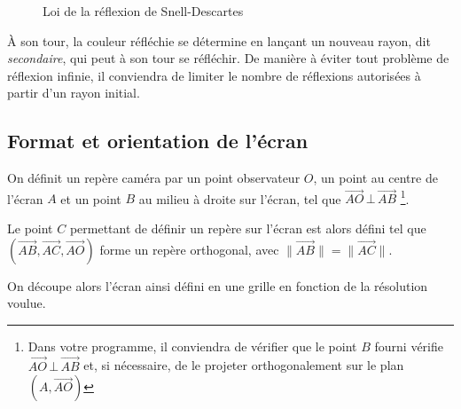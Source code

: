 \documentclass[10pt, a4paper ]{article}
\begin{document}
\begin{figure}[ht]
    \begin{center}
    \end{center}
    \caption{Loi de la réflexion de Snell-Descartes}
    \label{fig:descartes}
\end{figure}


À son tour, la couleur réfléchie se détermine en lançant un nouveau rayon, dit
\emph{secondaire}, qui peut à son tour se réfléchir. De manière à éviter tout
problème de réflexion infinie, il conviendra de limiter le nombre de réflexions
autorisées à partir d'un rayon initial.

\subsection{Format et orientation de l'écran}

On définit un repère caméra par un point observateur $O$, un point au centre de
l'écran $A$ et un point $B$ au milieu à droite sur l'écran, tel que
$\overrightarrow{AO}\, \bot\, \overrightarrow{AB}$ \footnote{Dans votre programme,
    il conviendra de vérifier que le point $B$ fourni vérifie
    $\overrightarrow{AO}\, \bot\, \overrightarrow{AB}$ et, si nécessaire, de le
    projeter orthogonalement sur le plan $\left( A, \overrightarrow{AO}
\right)$}.

Le point $C$ permettant de définir un repère sur l'écran est alors
défini tel que $\left( \overrightarrow{AB}, \overrightarrow{AC},
\overrightarrow{AO} \right)$ forme un repère orthogonal, avec $\lVert
\overrightarrow{AB} \rVert = \lVert \overrightarrow{AC} \rVert$.

On découpe alors l'écran ainsi défini en une grille en fonction de la résolution
voulue.
\end{document}
